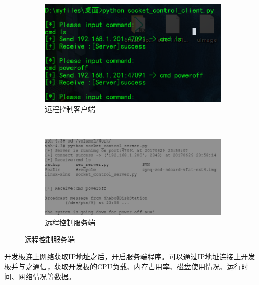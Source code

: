 \documentclass{itecreport-zh}
\begin{document}
\begin{figure}[!h]
\centering
  \begin{subfigure}[b]{0.5\textwidth}
  \includegraphics[width=\textwidth]{zynqctrl1.png}
  \caption{远程控制客户端}
  \end{subfigure}
  ~
  \begin{subfigure}[b]{0.4\textwidth}
  \includegraphics[width=\textwidth]{zynqctrl2.png}
  \caption{远程控制服务端}
  \end{subfigure}
\end{figure}

开发板连上网络获取IP地址之后，开启服务端程序。可以通过IP地址连接上开发板并与之通信，获取开发板的CPU负载、内存占用率、磁盘使用情况、运行时间、网络情况等数据。
\end{document}
